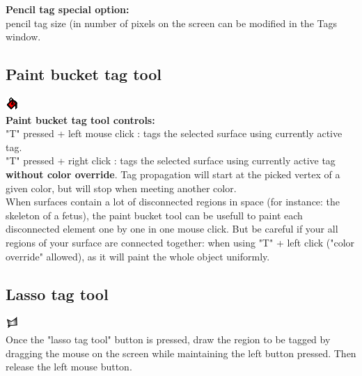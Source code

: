\textbf{Pencil tag special option:}\\
\noindent
pencil tag size (in number of pixels on the screen can be modified in the Tags window.



\subsection{Paint bucket tag tool}
\includegraphics[scale=0.7]{images/12/paint_bucket.png}\\
\textbf{Paint bucket tag tool controls:}\\
"T" pressed + left mouse click : tags the selected surface using currently active tag.\\
"T" pressed + right click : tags the selected surface using currently active tag \textbf{without color override}. Tag propagation will start at the picked vertex of a given color, but will stop when meeting another color.\\
 
When surfaces contain a lot of disconnected regions in space (for instance: the skeleton of a fetus), the paint bucket tool can be usefull to paint each disconnected element one by one in one mouse click. But be careful if your all regions of your surface are connected together: when using "T" + left click ("color override" allowed), as it will paint the whole object uniformly.

\subsection{Lasso tag tool} \label{lasso_tag_section}
\includegraphics[scale=0.7]{images/12/lasso.png}\\
Once the "lasso tag tool" button is pressed, draw the region to be tagged by dragging the mouse on the screen while maintaining the left button pressed. Then release the left mouse button. 

